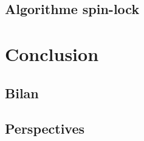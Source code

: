 \documentclass[9pt, handout]{beamer}
\begin{document}
\subsection{Algorithme spin-lock}
  
 
 
\section{Conclusion}
 
\subsection{Bilan}

 
\subsection{Perspectives}


\end{document}
